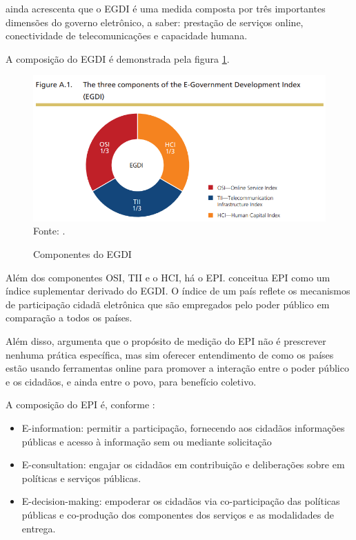 \cite{ONU_EGDI_description} ainda acrescenta que o EGDI é uma medida composta por três importantes dimensões do governo eletrônico, a saber: prestação de serviços online, conectividade de telecomunicações e capacidade humana. 

A composição do EGDI é demonstrada pela figura \ref{fig:egdi_componentes}.

\begin{figure}[H]
    \centering
    \caption{Componentes do EGDI}
    \includegraphics[width=1\linewidth]{figuras/egdi_componentes.png}
    \label{fig:egdi_componentes}
    \footnotesize{Fonte: \cite{ONU_EGDI_description}.}
\end{figure}

Além dos componentes OSI, TII e o HCI, há o EPI. \cite{ONU_EGDI_EPI_description} conceitua EPI como um índice suplementar derivado do EGDI. O índice de um país reflete os mecanismos de participação cidadã eletrônica que são empregados pelo poder público em comparação a todos os países.

Além disso, \cite{ONU_EGDI_EPI_description} argumenta que o propósito de medição do EPI não é prescrever nenhuma prática específica, mas sim oferecer entendimento de como os países estão usando ferramentas online para promover a interação entre o poder público e os cidadãos, e ainda entre o povo, para benefício coletivo.

A composição do EPI é, conforme \cite{ONU_EGDI_EPI_description}:

\begin{itemize}
    \item E-information: permitir a participação, fornecendo aos cidadãos informações públicas e acesso à informação sem ou mediante solicitação
    \item E-consultation: engajar os cidadãos em contribuição e deliberações sobre em políticas e serviços públicas.
    \item E-decision-making: empoderar os cidadãos via co-participação das políticas públicas e co-produção dos componentes dos serviços e as modalidades de entrega.
\end{itemize}

